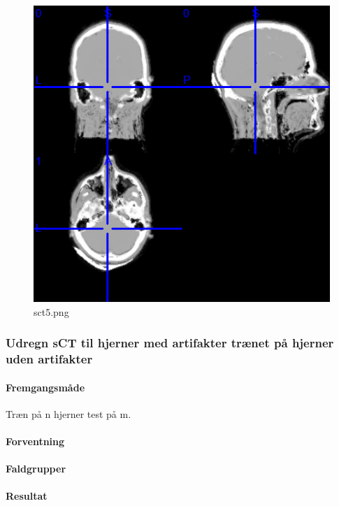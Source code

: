 \begin{figure}
\includegraphics[width=\linewidth]{sct5.png}
\caption{sct5.png}
\end{figure}

\subsubsection{Udregn sCT til hjerner med artifakter trænet på hjerner uden artifakter}
\paragraph{Fremgangsmåde}
Træn på n hjerner test på m.

\paragraph{Forventning}

\paragraph{Faldgrupper}

\paragraph{Resultat}

